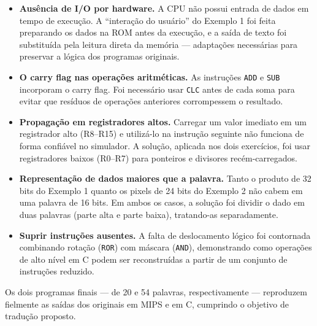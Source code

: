 \documentclass[12pt, a4paper]{article}
\begin{document}
\begin{itemize}[itemsep=4pt]
  \item \textbf{Ausência de I/O por hardware.} A CPU não possui entrada de dados em tempo de execução. A ``interação do usuário'' do Exemplo 1 foi feita preparando os dados na ROM antes da execução, e a saída de texto foi substituída pela leitura direta da memória --- adaptações necessárias para preservar a lógica dos programas originais.

  \item \textbf{O carry flag nas operações aritméticas.} As instruções \texttt{ADD} e \texttt{SUB} incorporam o carry flag. Foi necessário usar \texttt{CLC} antes de cada soma para evitar que resíduos de operações anteriores corrompessem o resultado.

  \item \textbf{Propagação em registradores altos.} Carregar um valor imediato em um registrador alto (R8--R15) e utilizá-lo na instrução seguinte não funciona de forma confiável no simulador. A solução, aplicada nos dois exercícios, foi usar registradores baixos (R0--R7) para ponteiros e divisores recém-carregados.

  \item \textbf{Representação de dados maiores que a palavra.} Tanto o produto de 32 bits do Exemplo 1 quanto os pixels de 24 bits do Exemplo 2 não cabem em uma palavra de 16 bits. Em ambos os casos, a solução foi dividir o dado em duas palavras (parte alta e parte baixa), tratando-as separadamente.

  \item \textbf{Suprir instruções ausentes.} A falta de deslocamento lógico foi contornada combinando rotação (\texttt{ROR}) com máscara (\texttt{AND}), demonstrando como operações de alto nível em C podem ser reconstruídas a partir de um conjunto de instruções reduzido.
\end{itemize}

Os dois programas finais --- de 20 e 54 palavras, respectivamente --- reproduzem fielmente as saídas dos originais em MIPS e em C, cumprindo o objetivo de tradução proposto.
\end{document}
